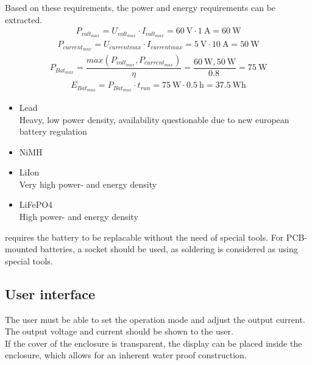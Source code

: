 Based on these requirements, the power and energy requirements can be extracted. 
\begin{align}
    P_{volt_{max}}
    = U_{volt_{max}} \cdot I_{volt_{max}}
    = \qty{60}{\volt} \cdot \qty{1}{\ampere}
    = \qty{60}{\watt}
\end{align}
\begin{align}
    P_{current_{max}}
    = U_{current{max}} \cdot I_{current{max}}
    = \qty{5}{\volt} \cdot \qty{10}{\ampere}
    = \qty{50}{\watt}
\end{align}
\begin{align}
    P_{Bat_{max}}
    = \dfrac{max\left(P_{volt_{max}}, P_{current_{max}}\right)}{\eta}
    = \dfrac{\qty{60}{\watt}, \qty{50}{\watt}}{\qty{0.8}{}}
    = \qty{75}{\watt}
\end{align}
\begin{align}
    E_{Bat_{max}}
    = P_{Bat_{max}} \cdot t_{run}
    = \qty{75}{\watt} \cdot \qty{0.5}{\hour}
    = \qty{37.5}{\watt\hour}
\end{align}

\begin{itemize}
    \item Lead
        \\
        Heavy, low power density, availability questionable due to new european battery regulation
    \item NiMH
        \\
    \item LiIon
        \\
        Very high power- and energy density
    \item LiFePO4
        \\
        High power- and energy density
\end{itemize}

 requires the battery to be replacable without the need of special tools. For PCB-mounted batteries, a socket should be used, as soldering is considered as using special tools. 

\subsection{User interface}
The user must be able to set the operation mode and adjust the output current. The output voltage and current should be shown to the user. \\
If the cover of the enclosure is transparent, the display can be placed inside the enclosure, which allows for an inherent water proof construction. 

